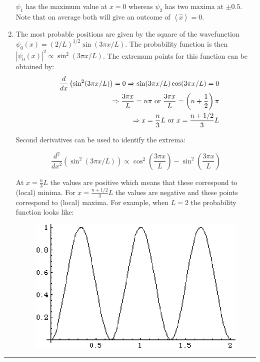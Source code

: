 \begin{enumerate}
$\psi_1$ has the maximum value at $x = 0$ whereas $\psi_2$ has two maxima at $\pm 0.5$. Note that on average both will give an outcome of $\left<\hat{x}\right> = 0$.

\item The most probable positions are given by the square of the wavefunction $\psi_0(x) = \left(2/L\right)^{1/2}\sin(3\pi x/L)$. The probability function is then $\left|\psi_0(x)\right|^2 \propto \sin^2(3\pi x/L)$. The extremum points for this function can be obtained by:
\begin{eqnarray}
\nonumber
& & \frac{d}{dx}\left(\sin^2(3\pi x/L)\right) = 0 \Rightarrow \sin(3\pi x/L)\cos(3\pi x/L) = 0\\
\nonumber
& & \Rightarrow \frac{3\pi x}{L} = n\pi\textnormal{ or }\frac{3\pi x}{L} = \left(n + \frac{1}{2}\right)\pi\\
\nonumber
& & \Rightarrow x = \frac{n}{3}L\textnormal{ or }x = \frac{n + 1/2}{3}L
\end{eqnarray}

Second derivatives can be used to identify the extrema:

$$\frac{d^2}{dx^2}\left(\sin^2(3\pi x/L)\right) \propto \cos^2\left(\frac{3\pi x}{L}\right) - \sin^2\left(\frac{3\pi x}{L}\right)$$

At $x = \frac{n}{3}L$ the values are positive which means that these correspond to (local) minima. For $x = \frac{n+1/2}{3}L$ the values are negative
and these points correspond to (local) maxima. For example, when $L = 2$ the probability function looks like:

\begin{figure}[htp!]
\centering\includegraphics[scale=0.7]{wavefun3}
\end{figure}

\end{enumerate}

\hrule\vspace{0.5cm}
